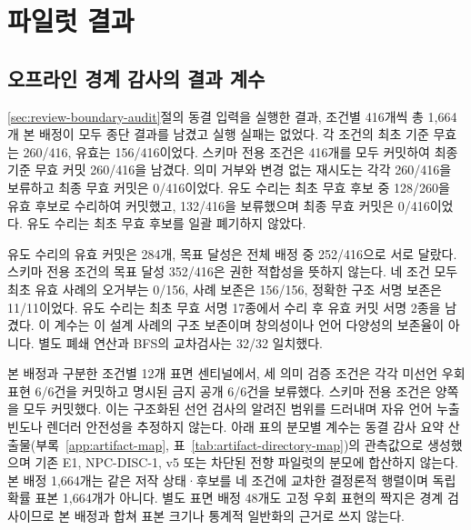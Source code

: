 \documentclass[journal]{IEEEtran}
\begin{document}
\section{파일럿 결과}\label{sec:results}




\subsection{오프라인 경계 감사의 결과 계수}\label{sec:review-boundary-results}
\ref{sec:review-boundary-audit}절의 동결 입력을 실행한 결과, 조건별 416개씩 총 1,664개 본 배정이 모두 종단 결과를 남겼고 실행 실패는 없었다. 각 조건의 최초 기준 무효는 260/416, 유효는 156/416이었다. 스키마 전용 조건은 416개를 모두 커밋하여 최종 기준 무효 커밋 260/416을 남겼다. 의미 거부와 변경 없는 재시도는 각각 260/416을 보류하고 최종 무효 커밋은 0/416이었다. 유도 수리는 최초 무효 후보 중 128/260을 유효 후보로 수리하여 커밋했고, 132/416을 보류했으며 최종 무효 커밋은 0/416이었다. 유도 수리는 최초 무효 후보를 일괄 폐기하지 않았다.

유도 수리의 유효 커밋은 284개, 목표 달성은 전체 배정 중 252/416으로 서로 달랐다. 스키마 전용 조건의 목표 달성 352/416은 권한 적합성을 뜻하지 않는다. 네 조건 모두 최초 유효 사례의 오거부는 0/156, 사례 보존은 156/156, 정확한 구조 서명 보존은 11/11이었다. 유도 수리는 최초 무효 서명 17종에서 수리 후 유효 커밋 서명 2종을 남겼다. 이 계수는 이 설계 사례의 구조 보존이며 창의성이나 언어 다양성의 보존율이 아니다. 별도 폐쇄 연산과 BFS의 교차검사는 32/32 일치했다.

본 배정과 구분한 조건별 12개 표면 센티널에서, 세 의미 검증 조건은 각각 미선언 우회 표현 6/6건을 커밋하고 명시된 금지 공개 6/6건을 보류했다. 스키마 전용 조건은 양쪽을 모두 커밋했다. 이는 구조화된 선언 검사의 알려진 범위를 드러내며 자유 언어 누출 빈도나 렌더러 안전성을 추정하지 않는다. 아래 표의 분모별 계수는 동결 감사 요약 산출물(부록~\ref{app:artifact-map}, 표~\ref{tab:artifact-directory-map})의 관측값으로 생성했으며 기존 E1, NPC-DISC-1, v5 또는 차단된 전향 파일럿의 분모에 합산하지 않는다.
본 배정 1,664개는 같은 저작 상태·후보를 네 조건에 교차한 결정론적 행렬이며 독립 확률 표본 1,664개가 아니다. 별도 표면 배정 48개도 고정 우회 표현의 짝지은 경계 검사이므로 본 배정과 합쳐 표본 크기나 통계적 일반화의 근거로 쓰지 않는다.








\end{document}
